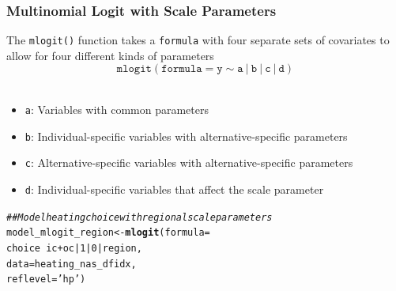 \documentclass{beamer}\usepackage[]{graphicx}\usepackage[]{color}
\makeatletter
\newcommand{\hlnum}[1]{\textcolor[rgb]{0.686,0.059,0.569}{#1}}%
\newcommand{\hlstr}[1]{\textcolor[rgb]{0.192,0.494,0.8}{#1}}%
\newcommand{\hlcom}[1]{\textcolor[rgb]{0.678,0.584,0.686}{\textit{#1}}}%
\newcommand{\hlopt}[1]{\textcolor[rgb]{0,0,0}{#1}}%
\newcommand{\hlstd}[1]{\textcolor[rgb]{0.345,0.345,0.345}{#1}}%
\newcommand{\hlkwb}[1]{\textcolor[rgb]{0.69,0.353,0.396}{#1}}%
\newcommand{\hlkwc}[1]{\textcolor[rgb]{0.333,0.667,0.333}{#1}}%
\newcommand{\hlkwd}[1]{\textcolor[rgb]{0.737,0.353,0.396}{\textbf{#1}}}%
\newenvironment{kframe}{%
 \def\at@end@of@kframe{}%
 \ifinner\ifhmode%
  \def\at@end@of@kframe{\end{minipage}}%
  \begin{minipage}{\columnwidth}%
 \fi\fi%
 \def\FrameCommand##1{\hskip\@totalleftmargin \hskip-\fboxsep
 \colorbox{shadecolor}{##1}\hskip-\fboxsep
     \hskip-\linewidth \hskip-\@totalleftmargin \hskip\columnwidth}%
 \MakeFramed {\advance\hsize-\width
   \@totalleftmargin\z@ \linewidth\hsize
   \@setminipage}}%
 {\par\unskip\endMakeFramed%
 \at@end@of@kframe}
\newenvironment{knitrout}{}{} %
\makeatother
\begin{document}
\begin{frame}[fragile]\frametitle{Multinomial Logit with Scale Parameters}
     The \texttt{mlogit()} function takes a \texttt{formula} with four separate sets of covariates to allow for four different kinds of parameters
    $$\mathtt{mlogit(formula = y \sim a ~|~ b ~|~ c ~|~ d)}$$ \\
    \begin{itemize}
    	\item \texttt{a}: Variables with common parameters
    	\item \texttt{b}: Individual-specific variables with alternative-specific parameters
    	\item \texttt{c}: Alternative-specific variables with alternative-specific parameters
    	\item \texttt{d}: Individual-specific variables that affect the scale parameter
    \end{itemize}
\begin{knitrout}\footnotesize
{}\color{fgcolor}\begin{kframe}
\begin{alltt}
\hlcom{## Model heating choice with regional scale parameters}
\hlstd{model_mlogit_region} \hlkwb{<-} \hlkwd{mlogit}\hlstd{(}\hlkwc{formula} \hlstd{=}
                                \hlstd{choice} \hlopt{~} \hlstd{ic} \hlopt{+} \hlstd{oc} \hlopt{|} \hlnum{1} \hlopt{|} \hlnum{0} \hlopt{|} \hlstd{region,}
                              \hlkwc{data} \hlstd{= heating_nas_dfidx,}
                              \hlkwc{reflevel} \hlstd{=} \hlstr{'hp'}\hlstd{)}
\end{alltt}
\end{kframe}
\end{knitrout}
\end{frame}
\end{document}
